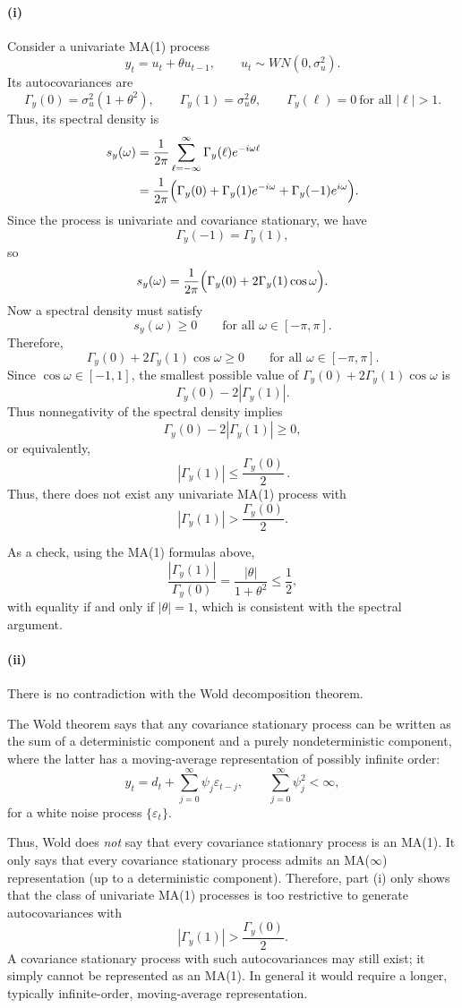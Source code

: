 \documentclass[11pt]{article}
\begin{document}
\paragraph{(i)}
Consider a univariate MA(1) process
\[
y_t = u_t + \theta u_{t-1},
\qquad
u_t \sim WN(0,\sigma_u^2).
\]
Its autocovariances are
\[
\Gamma_y(0)=\sigma_u^2(1+\theta^2),\qquad
\Gamma_y(1)=\sigma_u^2\theta,\qquad
\Gamma_y(\ell)=0 \ \text{for all } |\ell|>1.
\]
Thus, its spectral density is
\begin{align*}
s_y(\omega)
&= \frac{1}{2\pi}\sum_{\ell=-\infty}^{\infty}\Gamma_y(\ell)e^{-i\omega \ell} \\
&= \frac{1}{2\pi}\Bigl(\Gamma_y(0)+\Gamma_y(1)e^{-i\omega}+\Gamma_y(-1)e^{i\omega}\Bigr).
\end{align*}
Since the process is univariate and covariance stationary, we have
\[
\Gamma_y(-1)=\Gamma_y(1),
\]
so
\[
s_y(\omega)=\frac{1}{2\pi}\Bigl(\Gamma_y(0)+2\Gamma_y(1)\cos\omega\Bigr).
\]
Now a spectral density must satisfy
\[
s_y(\omega)\ge 0 \qquad \text{for all } \omega\in[-\pi,\pi].
\]
Therefore,
\[
\Gamma_y(0)+2\Gamma_y(1)\cos\omega \ge 0
\qquad \text{for all } \omega\in[-\pi,\pi].
\]
Since \(\cos\omega\in[-1,1]\), the smallest possible value of
\(\Gamma_y(0)+2\Gamma_y(1)\cos\omega\) is
\[
\Gamma_y(0)-2|\Gamma_y(1)|.
\]
Thus nonnegativity of the spectral density implies
\[
\Gamma_y(0)-2|\Gamma_y(1)|\ge 0,
\]
or equivalently,
\[
{\,|\Gamma_y(1)|\le \frac{\Gamma_y(0)}{2}\, .}
\]
Thus, there does not exist any univariate MA(1) process with
\[
|\Gamma_y(1)|>\frac{\Gamma_y(0)}{2}.
\]

As a check, using the MA(1) formulas above,
\[
\frac{|\Gamma_y(1)|}{\Gamma_y(0)}
=
\frac{|\theta|}{1+\theta^2}
\le \frac12,
\]
with equality if and only if \(|\theta|=1\), which is consistent with the spectral argument.

\paragraph{(ii)}
There is no contradiction with the Wold decomposition theorem.

The Wold theorem says that any covariance stationary process can be written as the sum of a deterministic component and a purely nondeterministic component, where the latter has a moving-average representation of possibly infinite order:
\[
y_t = d_t + \sum_{j=0}^{\infty}\psi_j \varepsilon_{t-j},
\qquad
\sum_{j=0}^{\infty}\psi_j^2<\infty,
\]
for a white noise process \(\{\varepsilon_t\}\).

Thus, Wold does \emph{not} say that every covariance stationary process is an MA(1). It only says that every covariance stationary process admits an MA(\(\infty\)) representation (up to a deterministic component). Therefore, part (i) only shows that the class of univariate MA(1) processes is too restrictive to generate autocovariances with
\[
|\Gamma_y(1)|>\frac{\Gamma_y(0)}{2}.
\]
A covariance stationary process with such autocovariances may still exist; it simply cannot be represented as an MA(1). In general it would require a longer, typically infinite-order, moving-average representation.
\end{document}

